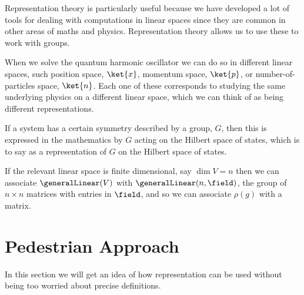 Representation theory is particularly useful because we have developed a lot
of tools for dealing with computations in linear spaces since they are common in
other areas of maths and physics.
Representation theory allows us to use these to work with groups.

\begin{app}{}{}
    When we solve the quantum harmonic oscillator we can do so in different
    linear spaces, such position space, \(\ket{x}\), momentum space, \(\ket{p}\), or
    number-of-particles space, \(\ket{n}\).
    Each one of these corresponds to studying the same underlying physics on
    a different linear space, which we can think of as being different
    representations.
    
    If a system has a certain symmetry described by a group, \(G\), then
    this is expressed in the mathematics by \(G\) acting on the Hilbert space of
    states, which is to say as a representation of \(G\) on the Hilbert space of
    states.
\end{app}

If the relevant linear space is finite dimensional, say \(\dim V = n\) then
we can associate \(\generalLinear(V)\) with \(\generalLinear(n, \field)\), the
group of \(n \times n\) matrices with entries in \(\field\), and so we can
associate \(\rho(g)\) with a matrix.

\section{Pedestrian Approach}
\begin{rmk}
    In this section we will get an idea of how representation can be used
    without being too worried about precise definitions.
\end{rmk}

